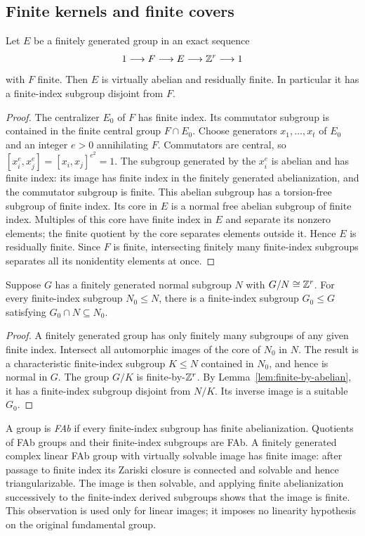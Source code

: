 \subsection{Finite kernels and finite covers}

\begin{lemma}\label{lem:finite-by-abelian}
Let \(E\) be a finitely generated group in an exact sequence
\[
 1\longrightarrow F\longrightarrow E\longrightarrow\mathbb Z^r
 \longrightarrow1
\]
with \(F\) finite. Then \(E\) is virtually abelian and residually
finite. In particular it has a finite-index subgroup disjoint from
\(F\).
\end{lemma}
\begin{proof}
The centralizer \(E_0\) of \(F\) has finite index. Its commutator
subgroup is contained in the finite central group \(F\cap E_0\).
Choose generators \(x_1,\ldots,x_t\) of \(E_0\) and an integer
\(e>0\) annihilating \(F\). Commutators are central, so
\([x_i^e,x_j^e]=[x_i,x_j]^{e^2}=1\).
The subgroup generated by the \(x_i^e\) is abelian and has finite
index: its image has finite index in the finitely generated
abelianization, and the commutator subgroup is finite.
This abelian subgroup has a torsion-free subgroup of finite index.
Its core in \(E\) is a normal free abelian subgroup of finite index.
Multiples of this core have finite index in \(E\) and separate its
nonzero elements; the finite quotient by the core separates elements
outside it. Hence \(E\) is residually finite. Since \(F\) is finite,
intersecting finitely many finite-index subgroups separates all its
nonidentity elements at once.
\end{proof}

\begin{lemma}\label{lem:realize-finite-index}
Suppose \(G\) has a finitely generated normal subgroup \(N\) with
\(G/N\cong\mathbb Z^r\). For every finite-index subgroup \(N_0\le N\),
there is a finite-index subgroup \(G_0\le G\) satisfying
\(G_0\cap N\subseteq N_0\).
\end{lemma}
\begin{proof}
A finitely generated group has only finitely many subgroups of any
given finite index. Intersect all automorphic images of the core of
\(N_0\) in \(N\). The result is a characteristic finite-index
subgroup \(K\le N\) contained in \(N_0\), and hence is normal in
\(G\). The group \(G/K\) is finite-by-\(\mathbb Z^r\).
By Lemma~\ref{lem:finite-by-abelian}, it has a finite-index subgroup
disjoint from \(N/K\). Its inverse image is a suitable \(G_0\).
\end{proof}

A group is \emph{FAb} if every finite-index subgroup has finite
abelianization. Quotients of FAb groups and their finite-index
subgroups are FAb. A finitely generated complex linear FAb group
with virtually solvable image has finite image: after passage to
finite index its Zariski closure is connected and solvable and hence
triangularizable. The image is then solvable, and applying finite
abelianization successively to the finite-index derived subgroups
shows that the image is finite. This observation is used only for
linear images; it imposes no linearity hypothesis on the original
fundamental group.
